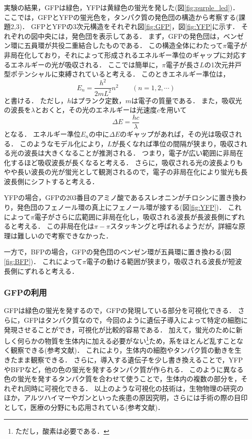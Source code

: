 \documentclass[a4paper,11pt, titlepage]{jsarticle}
\begin{document}
実験の結果，GFPは緑色，YFPは黄緑色の蛍光を発した(図\ref{fig:purple_led})．
ここでは，GFPとYFPの蛍光色を，タンパク質の発色団の構造から考察する(課題2,3)．
GFPとYFPの3次元構造をそれぞれ図\ref{fig:GFP}，図\ref{fig:YFP}に示す．
それぞれの図中央には，発色団を表示してある．
まず，GFPの発色団は，ベンゼン環に五員環が共役二重結合したものである．
この構造全体にわたって$\pi$電子が非局在化しており，それによって形成されるエネルギー準位のギャップに対応するエネルギーの光が吸収される．
ここでは簡単に，$\pi$電子が長さ$L$の1次元井戸型ポテンシャルに束縛されていると考える．
このときエネルギー準位は，
\begin{equation}
    E_n = \frac{h^2}{2mL^2}n^2\qquad (n=1,2,\cdots)
\end{equation}
と書ける．
ただし，$h$はプランク定数，$m$は電子の質量である．
また，吸収光の波長を$\lambda$とおくと，その光のエネルギーは光速度$c$を用いて
\begin{equation}
    \Delta E = \frac{hc}{\lambda}
\end{equation}
となる．
エネルギー準位$E_n$の中に$\Delta E$のギャップがあれば，その光は吸収される．
このようなモデル化により，$L$が長くなれば準位の間隔が狭まり，吸収される光の波長は大きくなることが推測される．
つまり，電子が広い範囲に非局在化するほど吸収波長が長くなると考える．
さらに，吸収される光の波長よりもやや長い波長の光が蛍光として観測されるので，電子の非局在化により蛍光も長波長側にシフトすると考える．

YFPの場合，GFPの203番目のアミノ酸であるスレオニンがチロシンに置き換わり，発色団のフェノール環の真上にフェノール環が接する(図\ref{fig:YFP})．
これによって$\pi$電子がさらに広範囲に非局在化し，吸収される波長が長波長側にずれると考える．
この非局在化は$\pi-\pi$スタッキングと呼ばれるようだが，詳細な原理は難しいので考察できなかった．

一方で，BFPの場合，GFPの発色団のベンゼン環が五員環に置き換わる(図\ref{fig:BFP})．
これによって$\pi$電子の動ける範囲が狭まり，吸収される波長が短波長側にずれると考える．

\subsubsection{GFPの利用}
GFPは緑色の蛍光を発するので，GFPの発現している部分を可視化できる．
さらに，GFPはタンパク質なので，今回のように遺伝子導入によって特定の細胞に発現させることができ，可視化が比較的容易である．
加えて，蛍光のために新しく何らかの物質を生体内に加える必要がない\footnote{ただし，酸素は必要である．}ため，系をほとんど乱すことなく観察できる(参考文献\cite{chemsta})．
これにより，生体内の細胞やタンパク質の動きを生きたまま観察できる．
さらに，導入する遺伝子を少し書き換えることで，YFPやBFPなど，他の色の蛍光を発するタンパク質が作られる．
このように異なる色の蛍光を発するタンパク質を合わせて使うことで，生体内の複数の部分を，それぞれ同時に可視化できる．
以上のような可視化の技術は，生物物理の研究のほか，アルツハイマーやガンといった疾患の原因究明，さらには手術の際の目印として，医療の分野にも応用されている(参考文献\cite{kahaku})．
\end{document}
